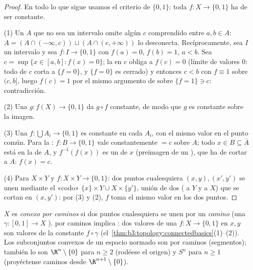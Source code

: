 \begin{proof}
En todo lo que sigue usamos el criterio de $\{0,1\}$: toda
$f \colon X \to
\{0,1\}$  ha de ser
constante.

(1) Un $A$ que no sea un intervalo omite algún $c$ comprendido entre
$a, b \in A$:
$A = (A \cap (-\infty, c)) \sqcup (A \cap (c, +\infty))$
lo desconecta. Recíprocamente, sea $I$ un intervalo y sea $f \colon I
\to \{0,1\}$  con
$f(a) = 0$, $f(b) = 1$, $a < b$. Sea
$c = \sup\{x \in [a,b] : f(x) = 0\}$; la
 en $c$ obliga a
$f(c) = 0$ (límite de valores $0$: todo
 de $c$ corta a $\{f = 0\}$, y
$\{f=0\}$ es cerrado) y entonces $c < b$ con $f \equiv 1$ sobre
$(c, b]$, luego $f(c) = 1$ por el mismo argumento de
 sobre $\{f = 1\} \ni c$:
contradicción.

(2) Una $g \colon f(X) \to \{0,1\}$
 da $g \circ f$ constante,
de modo que $g$ es constante sobre la imagen.

(3) Una $f\colon \bigcup A_i \to \{0,1\}$
 es constante en cada
$A_i$, con el mismo valor en el punto común. Para la
: $f \colon B \to \{0,1\}$
vale constantemente $= c$ sobre $A$; todo $x \in B \subseteq \bar A$
está en la  de $A$, y $f^{-1}
(f(x))$ es un  de $x$
(preimagen de un ), que ha de cortar a $A$: $f(x) = c$.

(4) Para $X \times Y$ y $f\colon X\times Y \to \{0,1\}$: dos puntos
cualesquiera $(x,y), (x',y')$ se unen mediante el «codo»
$\{x\}\times Y \cup X \times \{y'\}$, unión de dos
( a $Y$ y a $X$) que se
cortan en $(x, y')$: por (3) y (2), $f$ toma el mismo valor en los dos
puntos.
\end{proof}

\begin{definition}\label{def:b3:topology:pathconnected}
$X$ es \emph{conexo por caminos} si
dos puntos cualesquiera se unen por un \emph{camino} (una $\gamma
\colon [0,1] \to X$ ).
 por caminos implica
: dos valores de una
$f \colon X \to \{0,1\}$ 
en $x, y$ son valores de la constante $f\circ\gamma$
(el~\cref{thm:b3:topology:connectedbasics}(1)--(2)). Los subconjuntos
convexos de un espacio normado son
 por caminos (segmentos);
también lo son $\R^n
\setminus \{0\}$ para $n \geq 2$ (rodéese el origen) y $S^n$ para
$n \geq 1$ (proyéctense caminos desde $\R^{n+1}\setminus
\{0\}$).
\end{definition}

